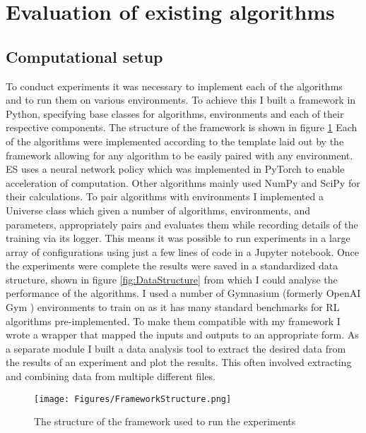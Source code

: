 \section{Evaluation of existing algorithms}

\subsection{Computational setup}
\label{sec:AlgComp}
To conduct experiments it was necessary to implement each of the algorithms and to run them on various environments. To achieve this I built a framework in Python, specifying base classes for algorithms, environments and each of their respective components. The structure of the framework is shown in figure \ref{fig:CodeStructure} Each of the algorithms were implemented according to the template laid out by the framework allowing for any algorithm to be easily paired with any environment. ES uses a neural network policy which was implemented in PyTorch \cite{PyTorch} to enable acceleration of computation. Other algorithms mainly used NumPy \cite{NumPy} and SciPy \cite{SciPy} for their calculations. To pair algorithms with environments I implemented a Universe class which given a number of algorithms, environments, and parameters, appropriately pairs and evaluates them while recording details of the training via its logger. This means it was possible to run experiments in a large array of configurations using just a few lines of code in a Jupyter notebook. Once the experiments were complete the results were saved in a standardized data structure, shown in figure \ref{fig:DataStructure} from which I could analyse the performance of the algorithms. I used a number of Gymnasium (formerly OpenAI Gym \cite{Gym}) environments to train on as it has many standard benchmarks for RL algorithms pre-implemented. To make them compatible with my framework I wrote a wrapper that mapped the inputs and outputs to an appropriate form.
As a separate module I built a data analysis tool to extract the desired data from the results of an experiment and plot the results. This often involved extracting and combining data from multiple different files.

\begin{figure}[H]
    \centering
    \texttt{[image: Figures/FrameworkStructure.png]}
    \caption{The structure of the framework used to run the experiments}
    \label{fig:CodeStructure}
\end{figure}


